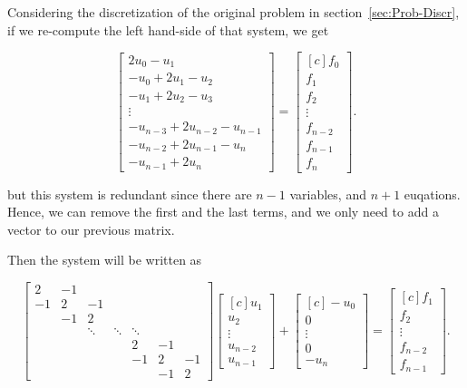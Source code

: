 \documentclass[fontsize=11pt,paper=a4,titlepage]{article}
\begin{document}
Considering the discretization of the original problem in section~\ref{sec:Prob-Discr}, if we re-compute the left hand-side of that system, we get

\begin{displaymath}
\begin{bmatrix}
	2u_0 - u_1 \\
	- u_0 + 2u_1 - u_2 \\
	- u_1 + 2u_2 - u_3 \\
	\vdots \\
	- u_{n - 3} + 2u_{n - 2} - u_{n - 1} \\
	- u_{n - 2} + 2u_{n - 1} - u_{n} \\
	- u_{n - 1} + 2u_n
\end{bmatrix}
=
\begin{bmatrix*}[c]
	f_0 \\
	f_1 \\
	f_2 \\
	\vdots \\
	f_{n - 2} \\
	f_{n - 1} \\
	f_n
\end{bmatrix*}.
\end{displaymath}

but this system is redundant since there are $n - 1$ variables, and $n + 1$
euqations. Hence, we can remove the first and the last terms, and we only need
to add a vector to our previous matrix.

Then the system will be written as

\begin{displaymath}
\begin{bmatrix}
	2 & -1 &  &  &  &  &  \\
	-1 & 2 & -1 &  &  &  &  \\
	 & -1 & 2 &  &  &  &  \\
	 &  & \ddots & \ddots & \ddots &  & \\
	 &  &  &  & 2 & -1 &  \\
	 &  &  &  & -1 & 2 & -1 \\
	 &  &  &  &  & -1 & 2
\end{bmatrix}
\begin{bmatrix*}[c]
	u_1 \\
	u_2 \\
	\vdots \\
	u_{n - 2} \\
	u_{n - 1}
\end{bmatrix*}
+ \begin{bmatrix*}[c]
	- u_0 \\
	0 \\
	\vdots \\
	0 \\
	- u_n
\end{bmatrix*}
=
\begin{bmatrix*}[c]
	f_1 \\
	f_2 \\
	\vdots \\
	f_{n - 2} \\
	f_{n - 1}
\end{bmatrix*}.
\end{displaymath}
\end{document}
